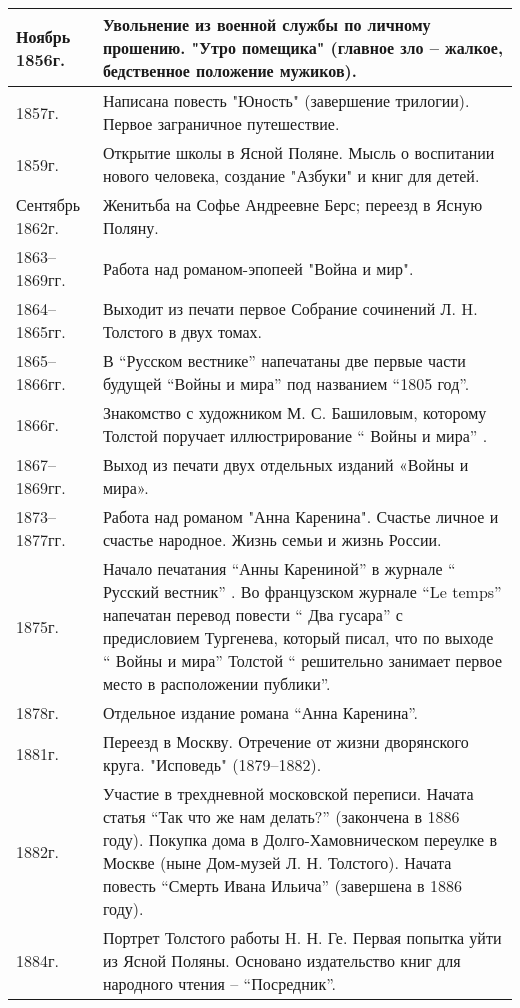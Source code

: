 \documentclass{article}
\begin{document}
\begin{longtable}[c]{|p{3cm}|p{8cm}|}
  \hline
  Ноябрь 1856г. & Увольнение из военной службы по личному прошению. "Утро помещика"
  (главное зло – жалкое, бедственное положение мужиков).\\
  \hline
  1857г. & Написана повесть "Юность" (завершение трилогии). Первое заграничное путешествие.\\
  \hline
  1859г. & Открытие школы в Ясной Поляне. Мысль о воспитании нового человека,
  создание "Азбуки" и книг для детей.\\
  \hline
  Сентябрь 1862г. & Женитьба на Софье Андреевне Берс; переезд в Ясную Поляну.\\
  \hline
  1863–1869гг. & Работа над романом-эпопеей "Война и мир".\\
  \hline
  1864–1865гг. & Выходит из печати первое Собрание сочинений Л. H. Толстого в двух томах.\\
  \hline
  1865–1866гг. & В ``Русском вестнике'' напечатаны две первые части будущей ``Войны и мира''
  под названием ``1805 год''.\\
  \hline
  1866г. & Знакомство с художником М. С. Башиловым, которому Толстой поручает иллюстрирование `` Войны и мира'' .\\
  \hline
  1867–1869гг. & Выход из печати двух отдельных изданий «Войны и мира».\\
  \hline
  1873–1877гг. & Работа над романом "Анна Каренина". Счастье личное и счастье народное.
  Жизнь семьи и жизнь России.\\
  \hline
  1875г. & Начало печатания ``Анны Карениной''  в журнале `` Русский вестник'' . 
  Во французском журнале ``Le temps'' напечатан перевод повести `` Два гусара''  с предисловием Тургенева,
  который писал, что по выходе `` Войны и мира''  Толстой `` решительно
  занимает первое место в расположении публики''.\\
  \hline
  1878г. & Отдельное издание романа ``Анна Каренина''.\\
  \hline
  1881г. & Переезд в Москву. Отречение от жизни дворянского круга. "Исповедь" (1879–1882).\\
  \hline
  1882г. & Участие в трехдневной московской переписи.
  Начата статья ``Так что же нам делать?'' (закончена в 1886 году).
  Покупка дома в Долго-Хамовническом переулке в Москве (ныне Дом-музей Л. Н. Толстого).
  Начата повесть ``Смерть Ивана Ильича'' (завершена в 1886 году).\\
  \hline
  1884г. & Портрет Толстого работы H. Н. Ге.
  Первая попытка уйти из Ясной Поляны. Основано издательство книг для народного чтения – ``Посредник''.\\

\end{longtable}
\end{document}
